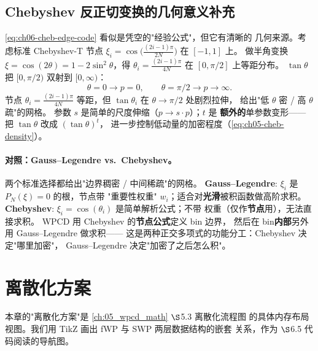 \subsection{Chebyshev 反正切变换的几何意义补充}
\label{subsec:ch06-cheb-geom}

\cref{eq:ch06-cheb-edge-code} 看似是凭空的"经验公式"，但它有清晰的
几何来源。考虑标准 Chebyshev-T 节点
\(\xi_i = \cos\bigl(\tfrac{(2i-1)\pi}{2N}\bigr)\) 在 \([-1, 1]\) 上。
做半角变换 \(\xi = \cos(2\theta) = 1 - 2\sin^2\theta\)，得
\(\theta_i = \tfrac{(2i-1)\pi}{4N}\) 在 \([0, \pi/2]\) 上等距分布。
\(\tan\theta\) 把 \([0, \pi/2)\) 双射到 \([0, \infty)\)：
\begin{equation}
\theta = 0 \to p = 0,
\qquad
\theta = \pi/2 \to p \to \infty.
\end{equation}
节点 \(\theta_i = \tfrac{(2i-1)\pi}{4N}\) 等距，但
\(\tan\theta_i\) 在 \(\theta \to \pi/2\) 处剧烈拉伸，
给出"低 \(\theta\) 密 / 高 \(\theta\) 疏"的网格。
参数 \(s\) 是简单的尺度伸缩（\(p \to s \cdot p\)）；\(t\) 是
\textbf{额外的}单参数变形——把 \(\tan\theta\) 改成 \((\tan\theta)^t\)，
进一步控制低动量的加密程度（\cref{eq:ch05-cheb-density}）。

\paragraph{对照：Gauss--Legendre vs.~Chebyshev。}
两个标准选择都给出"边界稠密 / 中间稀疏"的网格。
\textbf{Gauss--Legendre}: \(\xi_i\) 是 \(P_N(\xi) = 0\) 的根，节点带
"重要性权重" \(w_i\)；适合对\textbf{光滑}被积函数做高阶求积。
\textbf{Chebyshev}: \(\xi_i = \cos(\theta_i)\) 是简单解析公式；不带
权重（仅作\textbf{节点}用），无法直接求积。
WPCD 用 Chebyshev 的\textbf{节点公式}定义 bin 边界，
然后在 bin\textbf{内部}另外用 Gauss--Legendre 做求积——
这是两种正交多项式的功能分工：Chebyshev 决定"哪里加密"，
Gauss--Legendre 决定"加密了之后怎么积"。

\section{离散化方案}
\label{sec:ch06-discretization}

本章的"离散化方案"是 \cref{ch:05_wpcd_math} \(\S\)5.3 离散化流程图
的具体内存布局视图。我们用 TikZ 画出 fWP 与 SWP 两层数据结构的嵌套
关系，作为 \(\S\)6.5 代码阅读的导航图。


